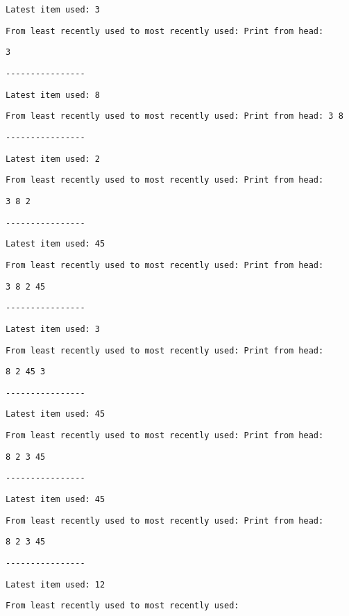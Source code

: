 \noindent %
\noindent\begin{minipage}[t]{1\columnwidth}%
\texttt{Latest item used: 3 }

\texttt{From least recently used to most recently used: Print from
head: }

\texttt{3 }

\texttt{-{}-{}-{}-{}-{}-{}-{}-{}-{}-{}-{}-{}-{}-{}-{}- }

\texttt{Latest item used: 8 }

\texttt{From least recently used to most recently used: Print from
head: 3 8 }

\texttt{-{}-{}-{}-{}-{}-{}-{}-{}-{}-{}-{}-{}-{}-{}-{}- }

\texttt{Latest item used: 2 }

\texttt{From least recently used to most recently used: Print from
head: }

\texttt{3 8 2 }

\texttt{-{}-{}-{}-{}-{}-{}-{}-{}-{}-{}-{}-{}-{}-{}-{}- }

\texttt{Latest item used: 45 }

\texttt{From least recently used to most recently used: Print from
head: }

\texttt{3 8 2 45 }

\texttt{-{}-{}-{}-{}-{}-{}-{}-{}-{}-{}-{}-{}-{}-{}-{}- }

\texttt{Latest item used: 3 }

\texttt{From least recently used to most recently used: Print from
head: }

\texttt{8 2 45 3}

\texttt{-{}-{}-{}-{}-{}-{}-{}-{}-{}-{}-{}-{}-{}-{}-{}- }

\texttt{Latest item used: 45 }

\texttt{From least recently used to most recently used: Print from
head: }

\texttt{8 2 3 45 }

\texttt{-{}-{}-{}-{}-{}-{}-{}-{}-{}-{}-{}-{}-{}-{}-{}- }

\texttt{Latest item used: 45 }

\texttt{From least recently used to most recently used: Print from
head: }

\texttt{8 2 3 45 }

\texttt{-{}-{}-{}-{}-{}-{}-{}-{}-{}-{}-{}-{}-{}-{}-{}- }

\texttt{Latest item used: 12 }

\texttt{From least recently used to most recently used: }


\end{minipage}
